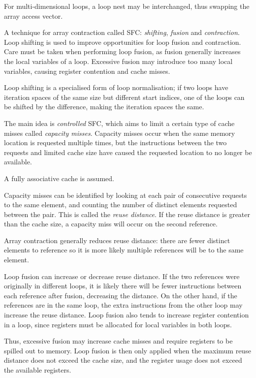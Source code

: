 For multi-dimensional loops, a loop nest may be interchanged, thus swapping the array access vector.

A technique for array contraction called SFC: \emph{shifting}, \emph{fusion} and \emph{contraction}.
Loop shifting is used to improve opportunities for loop fusion and contraction. 
Care must be taken when performing loop fusion, as fusion generally increases the local variables of a loop.
Excessive fusion may introduce too many local variables, causing register contention and cache misses.

Loop shifting is a specialised form of loop normalisation; if two loops have iteration spaces of the same size but different start indices,
one of the loops can be shifted by the difference, making the iteration spaces the same.

The main idea is \emph{controlled} SFC, which aims to limit a certain type of cache misses called \emph{capacity misses}.
Capacity misses occur when the same memory location is requested multiple times, but the instructions between the two requests
and limited cache size have caused the requested location to no longer be available.

A fully associative cache is assumed.

Capacity misses can be identified by looking at each pair of consecutive requests to the same element,
and counting the number of distinct elements requested between the pair. This is called the \emph{reuse distance}.
If the reuse distance is greater than the cache size, a capacity miss will occur on the second reference.

Array contraction generally reduces reuse distance: there are fewer distinct elements to reference so it is more likely
multiple references will be to the same element.

Loop fusion can increase or decrease reuse distance. If the two references were originally in different loops,
it is likely there will be fewer instructions between each reference after fusion, decreasing the distance.
On the other hand, if the references are in the same loop, the extra instructions from the other loop
may increase the reuse distance.
Loop fusion also tends to increase register contention in a loop, since registers must be allocated for local variables in both loops.

Thus, excessive fusion may increase cache misses and require registers to be spilled out to memory.
Loop fusion is then only applied when the maximum reuse distance does not exceed the cache size,
and the register usage does not exceed the available registers.


